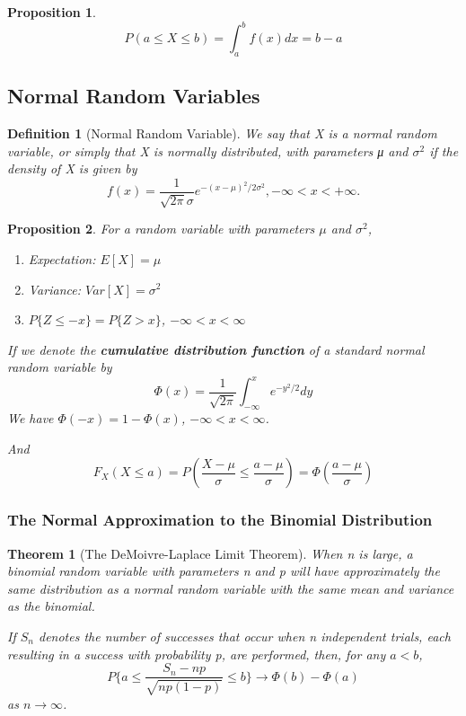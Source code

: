 \documentclass[12pt]{article}
\newtheorem{definition}{Definition}[subsection]
\newtheorem{theorem}{Theorem}[subsection]
\newtheorem{proposition}{Proposition}[subsection]
\begin{document}
            \begin{proposition}
                \[P(a \leq X \leq b) = \int_a^b f(x)dx = b - a\]
            \end{proposition}

        \subsection{Normal Random Variables}
            \begin{definition}[Normal Random Variable]
                We say that X is a normal random variable, or simply that X is normally distributed, with parameters μ and $σ^2$ if the density of X is given by
                    \[f(x) = \frac{1}{\sqrt{2\pi}\sigma}e^{-(x-\mu)^2/2\sigma^2}, -\infty < x < +\infty.\]
            \end{definition}
            \begin{proposition}
                For a random variable with parameters $\mu$ and $\sigma^2$,
                    \begin{enumerate}
                        \item Expectation: $E[X] = \mu$
                        \item Variance: $Var[X] = \sigma^2$
                        \item $P\{Z \leq -x\} = P\{Z > x\}$, $-\infty < x < \infty$
                    \end{enumerate}
                If we denote the \textbf{cumulative distribution function} of a standard normal random variable by 
                    \[\Phi(x) = \frac{1}{\sqrt{2\pi}}\int^x_{-\infty}e^{-y^2/2}dy\]
                We have $\Phi(-x) = 1 - \Phi(x)$, $-\infty < x < \infty$.
                
                And
                \[F_X(X \leq a) = P(\frac{X - \mu}{\sigma} \leq \frac{a - \mu}{\sigma}) = \Phi(\frac{a - \mu}{\sigma}) \]
            \end{proposition}
            \subsubsection{The Normal Approximation to the Binomial Distribution}
                \begin{theorem}[The DeMoivre-Laplace Limit Theorem]
                    When n is large, a binomial random variable with parameters n and p will have approximately the same distribution as a normal random variable with the same mean and variance as the binomial. 

                    If $S_n$ denotes the number of successes that occur when n independent trials, each resulting in a success with probability p, are performed, then, for any $a < b$,
                        \[P\lbrace a \leq \frac{S_n - np}{\sqrt{np(1-p)}} \leq b\rbrace \rightarrow \Phi(b) - \Phi(a)\]
                    as $n \rightarrow \infty$.
                \end{theorem}
                
\end{document}
